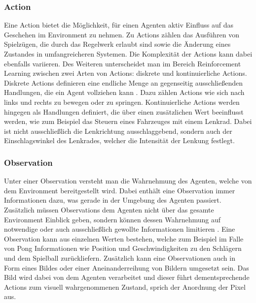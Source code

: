 \documentclass[11pt]{scrartcl}
\begin{document}
\subsubsection{Action}
\label{sec:action}
Eine Action bietet die Möglichkeit, für einen Agenten aktiv Einfluss auf das Geschehen im
Environment zu nehmen. Zu Actions zählen das Ausführen von Spielzügen, die durch das
Regelwerk erlaubt sind sowie die Änderung eines Zustandes in umfangreicheren Systemen. Die
Komplexität der Actions kann dabei ebenfalls variieren. Des Weiteren unterscheidet man im Bereich
Reinforcement Learning zwischen zwei Arten von Actions: diskrete und kontinuierliche Actions.
Diskrete Actions definieren eine endliche Menge an gegenseitig ausschließenden Handlungen, die ein
Agent vollziehen kann \cite[~S.8]{L2018}. Dazu zählen Actions wie sich nach links und rechts zu
bewegen oder zu springen. Kontinuierliche Actions werden hingegen als Handlungen definiert, die
über einen zusätzlichen Wert beeinflusst werden, wie zum Beispiel das Steuern eines Fahrzeuges
mit einem Lenkrad. Dabei ist nicht ausschließlich die Lenkrichtung ausschlaggebend, sondern auch
der Einschlagswinkel des Lenkrades, welcher die Intensität der Lenkung festlegt.


\subsubsection{Observation}
Unter einer Observation versteht man die Wahrnehmung des Agenten, welche von dem Environment 
bereitgestellt wird. Dabei enthält eine Observation immer Informationen dazu, was gerade in der
Umgebung des Agenten passiert. Zusätzlich müssen Observations dem Agenten nicht über das
gesamte Environment Einblick geben, sondern können dessen Wahrnehmung auf notwendige oder auch
ausschließlich gewollte Informationen limitieren \cite[~S.8 f.]{L2018}. Eine Observation kann 
aus einzelnen Werten bestehen, welche zum Beispiel im Falle von Pong Informationen wie Position
und Geschwindigkeiten zu den Schlägern und dem Spielball zurückliefern. Zusätzlich kann eine
Observationen auch in Form eines Bildes oder einer Aneinanderreihung von Bildern umgesetzt sein.
Das Bild wird dabei von dem Agenten verarbeitet und dieser führt dementsprechende Actions zum
visuell wahrgenommenen Zustand, sprich der Anordnung der Pixel aus. 
\end{document}
